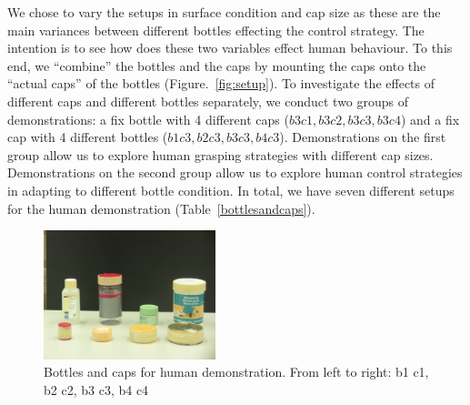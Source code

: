 
We chose to vary the setups in surface condition and cap size as these are the main variances between different bottles effecting the control strategy. The intention is to see how does these two variables effect human behaviour. To this end, we ``combine'' the bottles and the caps by mounting the caps onto the ``actual caps'' of the bottles (Figure.~\ref{fig:setup}). To investigate the effects of different caps and different bottles separately, we conduct two groups of demonstrations: a fix bottle with 4 different caps ($b3c1, b3c2, b3c3, b3c4$) and a fix cap with 4 different bottles ($b1c3, b2c3, b3c3, b4c3$). Demonstrations on the first group allow us to explore human grasping strategies with different cap sizes. Demonstrations on the second group allow us to explore human control strategies in adapting to different bottle condition. In total, we have seven different setups for the human demonstration (Table~\ref{bottlesandcaps}).


\begin{figure}
  \centering
  \includegraphics[width=5cm]{./fig/b_c.jpg}
  \caption{ \scriptsize{Bottles and caps for human demonstration. From left to right: b1 c1, b2 c2, b3 c3, b4  c4}
}
\label{fig:b_c}
\end{figure}





